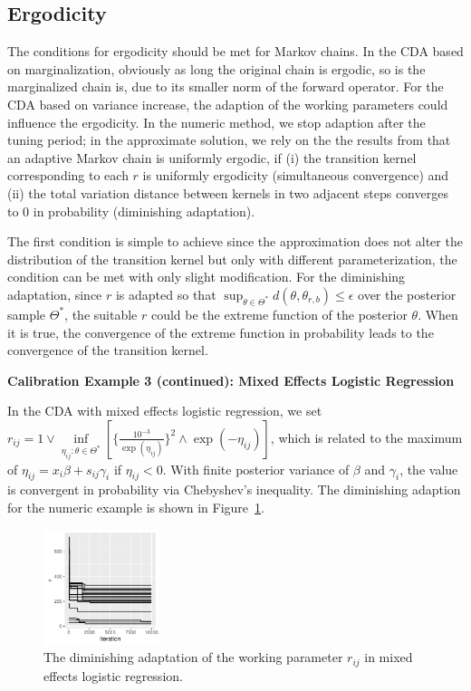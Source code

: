 \documentclass[10pt]{article}
\newcommand{\xbeta}{ x_i \beta}
\begin{document}
\subsection{Ergodicity}

The conditions for ergodicity should be met for Markov chains. In the CDA based on marginalization, obviously as long the original chain is ergodic, so is the marginalized chain is, due to its smaller norm of the forward operator. For the CDA based on variance increase, the adaption of the working parameters could influence the ergodicity. In the numeric method, we stop adaption after the tuning period; in the approximate solution, we rely on the the results from \cite{roberts2007coupling} that an adaptive Markov chain is uniformly ergodic, if (i) the transition kernel corresponding to each $r$ is uniformly ergodicity (simultaneous convergence) and (ii) the total variation distance between kernels in two adjacent steps converges to $0$ in probability (diminishing adaptation).

The first condition is simple to achieve since the approximation does not alter the distribution of the transition kernel but only with different parameterization, the condition can be met with only slight modification. For the diminishing adaptation, since $r$ is adapted so that $\sup_{\theta \in \varTheta^*} d(\theta, \theta_{r,b})\le \epsilon$ over the posterior sample $\varTheta^*$, the suitable $r$ could be the extreme function of the posterior $\theta$. When it is true, the convergence of the extreme function in probability leads to the convergence of the transition kernel.

{\bf Calibration Example 3 (continued): Mixed Effects Logistic Regression}

In the CDA with mixed effects logistic regression, we set $r_{ij} =  1 \vee \underset{\eta_{ij}: \theta\in \varTheta^*}{\inf}[\{\frac{10^{-3} }{\exp(\eta_{ij})}\}^2  \wedge {\exp(-\eta_{ij})} ]   $, which is related to the maximum of $\eta_{ij}=\xbeta+s_{ij}\gamma_i$ if $\eta_{ij}<0$. With finite posterior variance of $\beta$ and $\gamma_i$, the value is convergent in probability via Chebyshev's inequality. The diminishing adaption for the numeric example is shown in Figure~\ref{diminishing_adapt}.

 \begin{figure}[H]
 \centering
 \includegraphics[width=0.3\textwidth]{r_adaptation.pdf}
  \caption{The diminishing adaptation of the working parameter $r_{ij}$ in mixed effects logistic regression.}
  \label{diminishing_adapt}
 \end{figure}
\end{document}

